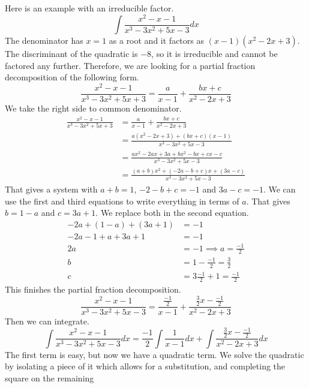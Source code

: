 \documentclass[fleqn]{report}
\begin{document}
\begin{example}
Here is an example with an irreducible factor.
\begin{equation*}
\int \frac{x^2-x-1}{x^3-3x^2+5x-3} dx
\end{equation*}
The denominator has $x=1$ as a root and it factors as
$(x-1)(x^2-2x+3)$. The discriminant of the quadratic is $-8$, so
it is irreducible and cannot be factored any further.
Therefore, we are looking for a partial fraction decomposition
of the following form.
\begin{equation*}
\frac{x^2- x - 1}{x^3-3x^2+5x+3} = \frac{a}{x-1} +
\frac{bx+c}{x^2-2x+3} 
\end{equation*}
We take the right side to common denominator.
\begin{align*}
\frac{x^2- x - 1}{x^3-3x^2+5x+3} & = \frac{a}{x-1} +
\frac{bx+c}{x^2-2x+3} \\
& = \frac{a(x^2 - 2x + 3) + (bx+c)(x-1)}{x^3-3x^2+5x-3} \\
& = \frac{ax^2 - 2ax + 3a + bx^2 - bx + cx -c}{x^3-3x^2+5x-3} \\
& = \frac{(a+b)x^2 + (-2a-b+c)x + (3a-c)}{x^3-3x^2+5x-3} 
\end{align*}
That gives a system with $a+b=1$, $-2-b+c=-1$ and $3a-c=-1$.
We can use the first and third equations to write everything
in terms of $a$. That gives $b = 1-a$ and
$c = 3a+1$. We replace both in the second equation.
\begin{align*}
-2a + (1-a) + (3a + 1) & = -1 \\
-2a -1 + a + 3a + 1 & = -1 \\
2a & = -1 \implies a = \frac{-1}{2} \\
b & = 1 - \frac{-1}{2} = \frac{3}{2} \\
c & = 3 \frac{-1}{2} + 1 = \frac{-1}{2} 
\end{align*}
This finishes the partial fraction decomposition.
\begin{equation*}
\frac{x^2-x-1}{x^3-3x^2+5x-3} = \frac{\frac{-1}{2}}{x-1} +
\frac{\frac{3}{2} x - \frac{-1}{2}}{x^2 - 2x +3}
\end{equation*}
Then we can integrate.
\begin{equation*}
\int \frac{x^2-x-1}{x^3-3x^2+5x-3} dx = \frac{-1}{2} \int
\frac{1}{x-1} dx + \int \frac{\frac{3}{2} x - \frac{-1}{2}}{x^2 -
2x +3} dx
\end{equation*}
The first term is easy, but now we have a quadratic term.
We solve the quadratic by isolating a piece of it which allows
for a substitution, and completing the square on the remaining

\end{example}
\end{document}
